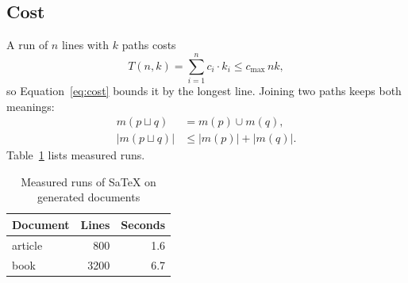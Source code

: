 \subsection{Cost}\label{sec:cost}
A run of $n$ lines with $k$ paths costs
\begin{equation}\label{eq:cost}
  T(n, k) = \sum_{i=1}^{n} c_i \cdot k_i \le c_{\max}\, n k ,
\end{equation}
so Equation~\eqref{eq:cost} bounds it by the longest line.
Joining two paths keeps both meanings:
\begin{align}
  m(p \sqcup q) &= m(p) \cup m(q), \label{eq:join}\\
  |m(p \sqcup q)| &\le |m(p)| + |m(q)| .
\end{align}
Table~\ref{tab:runs} lists measured runs.
\begin{table}[ht]
  \centering
  \begin{tabular}{lrr}
    Document & Lines & Seconds \\
    \hline
    article & 800 & 1.6 \\
    book & 3200 & 6.7 \\
  \end{tabular}
  \caption[Measured runs]{Measured runs of SaTeX on generated documents}\label{tab:runs}
\end{table}
